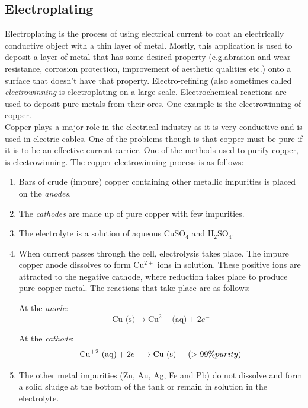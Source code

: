 \subsection{Electroplating}

Electroplating is the process of using electrical current to coat an electrically conductive object with a thin layer of metal. Mostly, this application is used to deposit a layer of metal that has some desired property (e.g.\@ abrasion and wear resistance, corrosion protection, improvement of aesthetic qualities etc.) onto a surface that doesn't have that property. Electro-refining (also sometimes called \textit{electrowinning} is electroplating on a large scale. Electrochemical reactions are used to deposit pure metals from their ores. One example is the electrowinning of copper.\\

Copper plays a major role in the electrical industry as it is very conductive and is used in electric cables. One of the problems though is that copper must be pure if it is to be an effective current carrier. One of the methods used to purify copper, is electrowinning. The copper electrowinning process is as follows:

\begin{enumerate}
  \item Bars of crude (impure) copper containing other metallic
  impurities is placed on the \emph{anodes}.
  \item The \emph{cathodes} are made up of pure copper with few impurities.
  \item The electrolyte is a solution of aqueous $\text{CuSO}_{4}$ and $\text{H}_{2}\text{SO}_{4}$.
  \item When current passes through the cell, electrolysis takes place. The impure copper anode dissolves to form Cu$^{2+}$ ions in solution. These positive ions are attracted to the negative cathode, where reduction takes place to produce pure copper metal. The reactions that take place are as follows:

At the \emph{anode}:
\begin{equation*}
\text{Cu (s)} \rightarrow \text{Cu}^{2+}\text{ (aq)} + 2e^{-}
  \end{equation*}

At the \emph{cathode}:
\begin{equation*}
\text{Cu}^{+2}\text{ (aq)} + 2e^{-} \rightarrow \text{Cu (s)} \hspace{.5cm} (> 99\% purity)
\end{equation*}

  \item The other metal impurities (Zn, Au, Ag, Fe and Pb) do not
  dissolve and form a solid sludge at the bottom of the tank or
  remain in solution in the electrolyte.
\end{enumerate}

